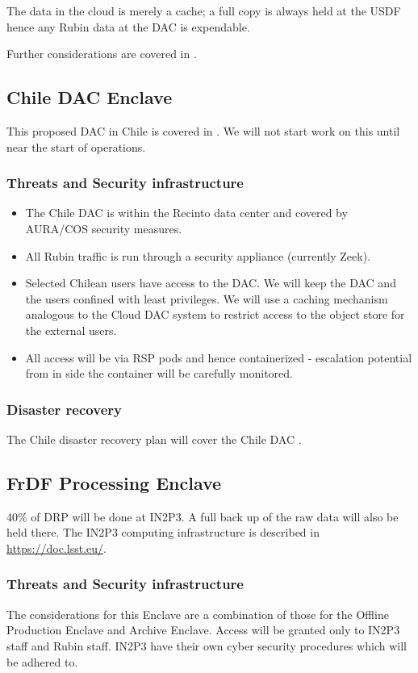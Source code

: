 The data in the cloud is merely a cache; a full copy is always held at the \gls{USDF} hence any Rubin data at the DAC is expendable.

Further considerations are covered in .

\subsection{ Chile \gls{DAC} Enclave}
This proposed DAC in Chile is covered in \cite{LDM-572}.
We will not start work on this until near the start of operations.
\subsubsection{ Threats and Security infrastructure}

\begin{itemize}
\item The Chile DAC is within the Recinto data center and covered by AURA/COS security measures.\item All Rubin traffic is run through a security appliance (currently Zeek).
\item Selected Chilean users have access to the DAC. We will keep the DAC and the users confined with least privileges. We will use a caching mechanism analogous to the Cloud DAC system to restrict access to the object store for the external users.
\item All access will be via \gls{RSP} pods and hence containerized - escalation potential from in side the container will be carefully monitored.
\end{itemize}
\subsubsection{Disaster recovery}
The Chile disaster recovery plan will cover the Chile \gls{DAC} .



\subsection{FrDF Processing  \gls{Enclave}}
40\% of \gls{DRP} will be done at IN2P3.
A full back up of the raw data will also be held there.
The IN2P3 computing infrastructure is described in \url{https://doc.lsst.eu/}.
\subsubsection{Threats and Security infrastructure}
The considerations for this Enclave are a combination of those for the Offline Production Enclave and Archive Enclave.
Access will be granted only to IN2P3 staff and Rubin staff.
IN2P3 have their own cyber security procedures which will be adhered to.
